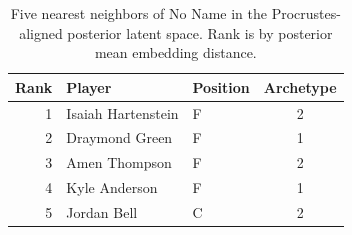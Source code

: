 \begin{table}[htbp]
  \centering\small
  \begin{tabular}{rllc}
    \toprule
    Rank & Player & Position & Archetype \\
    \midrule
    1 & Isaiah Hartenstein & F & 2 \\
    2 & Draymond Green & F & 1 \\
    3 & Amen Thompson & F & 2 \\
    4 & Kyle Anderson & F & 1 \\
    5 & Jordan Bell & C & 2 \\
    \bottomrule
  \end{tabular}
  \caption{Five nearest neighbors of No Name in the Procrustes-aligned posterior latent space. Rank is by posterior mean embedding distance.}
  \label{tab:No_Name_neighbors}
\end{table}

